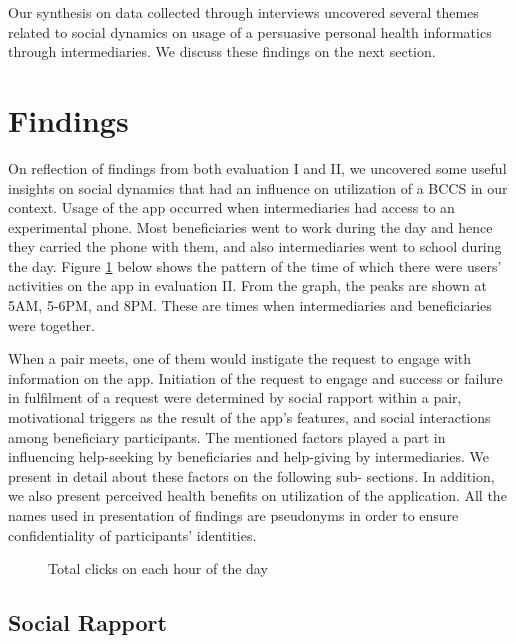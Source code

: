 \documentclass{sig-alternate}
\begin{document}
Our synthesis on data collected through interviews uncovered several themes
related to social dynamics on usage of a persuasive personal health
informatics through intermediaries. We discuss these findings on the next
section.

\section{Findings}

On reflection of findings from both evaluation I and II,  we uncovered some
useful insights on social dynamics that had an influence on utilization of a
BCCS in our context. Usage of the app occurred when intermediaries had access
to an experimental phone. Most beneficiaries went to work during the day and
hence they carried the phone with them, and  also intermediaries went to
school during the day. Figure \ref{figure:hourpattern} below shows the pattern
of the time of which there were users' activities on the app in evaluation II.
From the graph, the peaks are shown at 5AM, 5-6PM, and 8PM. These are times
when intermediaries and beneficiaries were together.

When a pair meets, one of them would instigate the request to engage with
information on the app. Initiation of the request to engage and success or
failure in fulfilment of a request were determined by social rapport within a
pair, motivational triggers as the result of the app's features, and social
interactions among beneficiary participants. The mentioned factors played a
part in influencing help-seeking by beneficiaries and help-giving by
intermediaries. We present in detail about these factors on the following sub-
sections. In addition, we also present perceived health benefits on
utilization of the application. All the names used in presentation of findings
are pseudonyms in order to ensure confidentiality of participants' identities.

 \begin{figure}
\centering
{}
\caption{Total clicks on each hour of the day}
\label{figure:hourpattern}
\end{figure}

\subsection{Social Rapport}
\end{document}
